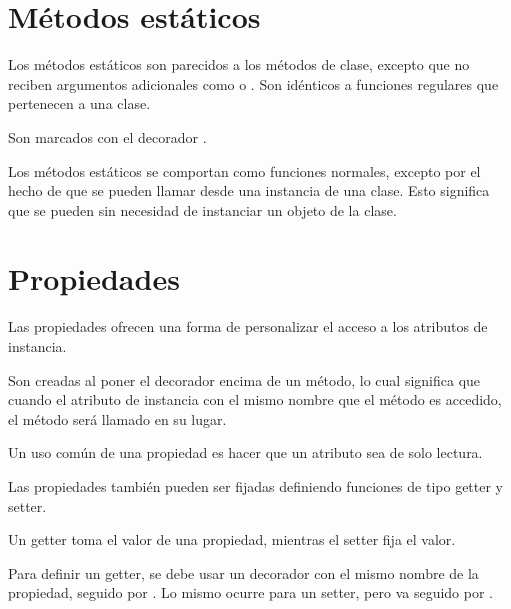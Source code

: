 
\section{Métodos estáticos}

Los métodos estáticos son parecidos a los métodos de clase, excepto que no reciben argumentos adicionales como  o .
Son idénticos a funciones regulares que pertenecen a una clase.
\medskip

Son marcados con el decorador .



Los métodos estáticos se comportan como funciones normales, excepto por el hecho de que se pueden llamar desde una instancia de una clase.
Esto significa que se pueden sin necesidad de instanciar un objeto de la clase.

\section{Propiedades}

Las propiedades ofrecen una forma de personalizar el acceso a los atributos de instancia.
\medskip

Son creadas al poner el decorador  encima de un método, lo cual significa que cuando el atributo de instancia con el mismo nombre que el método es accedido, el método será llamado en su lugar.
\medskip

Un uso común de una propiedad es hacer que un atributo sea de solo lectura.



Las propiedades también pueden ser fijadas definiendo funciones de tipo getter y setter.
\medskip

Un getter toma el valor de una propiedad, mientras el setter fija el valor.
\medskip

Para definir un getter, se debe usar un decorador con el mismo nombre de la propiedad, seguido por .
Lo mismo ocurre para un setter, pero va seguido por .


\clearpage